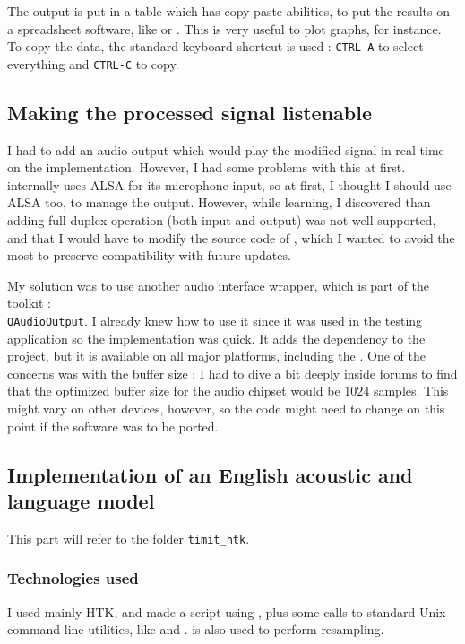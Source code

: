 The output is put in a table which has copy-paste abilities, to put the results on a spreadsheet software, like  or . This is very useful to plot graphs, for instance.
To copy the data, the standard keyboard shortcut is used : \texttt{CTRL-A} to select everything and \texttt{CTRL-C} to copy.

\subsection{Making the processed signal listenable}
I had to add an audio output which would play the modified signal in real time on the  implementation. However, I had some problems with this at first.  internally uses \ac{ALSA} for its microphone input, so at first, I thought I should use \ac{ALSA} too, to manage the output. However, while learning, I discovered than adding full-duplex operation (both input and output) was not well supported, and that I would have to modify the source code of , which I wanted to avoid the most to preserve compatibility with future updates.

My solution was to use another audio interface wrapper, which is part of the  toolkit :\\ \texttt{QAudioOutput}. I already knew how to use it since it was used in the testing application so the implementation was quick. It adds the  dependency to the project, but it is available on all major platforms, including the . One of the concerns was with the buffer size : I had to dive a bit deeply inside  forums to find that the optimized buffer size for the audio chipset would be $1024$ samples. This might vary on other devices, however, so the code might need to change on this point if the software was to be ported.

\subsection{Implementation of an English acoustic and language model}
This part will refer to the folder \texttt{timit\_htk}. 
\subsubsection{Technologies used}
I used mainly \ac{HTK}, and made a script using , plus some calls to standard Unix command-line utilities, like  and .  is also used to perform resampling.
